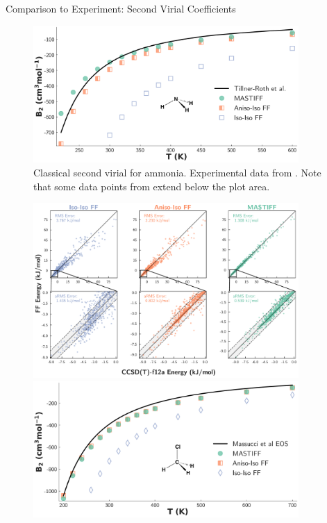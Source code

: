 \begin{subsection}{Comparison to Experiment: Second Virial Coefficients}
\begin{figure}[ht]
    \includegraphics[width=0.9\textwidth]{anisotropic/virials/nh3/nh3_2nd_virial.pdf}
    \caption{
        Classical second virial for ammonia. Experimental data from
            .
        Note that some data points from \isoff extend below the plot area.
            }
    \label{fig:nh3_virial}
    \end{figure}
    \begin{figure}[ht]
    \includegraphics[width=0.9\textwidth]{anisotropic/scatterplots/chloromethane_chloromethane_comparison.pdf}
    \includegraphics[width=0.9\textwidth]{anisotropic/virials/chloromethane/chloromethane_2nd_virial.pdf}

\end{figure}
\end{subsection}
